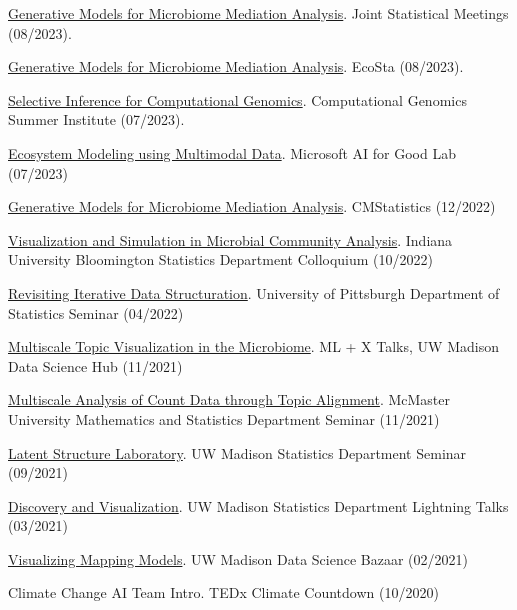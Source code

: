 \documentclass[letterpaper]{article}
\renewenvironment{itemize}{
  \begin{list}{}{
    \setlength{\leftmargin}{1.5em}
  }
}{
  \end{list}
}
\begin{document}
\begin{itemize}
  \item \href{https://drive.google.com/file/d/1lQBb665vsyILnknqMdGZMPkj-7Nhhgqw/view?usp=drive_link}{Generative Models for Microbiome Mediation Analysis}. Joint Statistical Meetings (08/2023).
  \item \href{https://go.wisc.edu/77q6rs}{Generative Models for Microbiome Mediation Analysis}. EcoSta (08/2023).
  \item \href{https://go.wisc.edu/7l1k95}{Selective Inference for Computational Genomics}. Computational Genomics Summer Institute (07/2023).
  \item \href{https://krisrs1128.github.io/talks/2023/20230705/20230705.html}{Ecosystem Modeling using Multimodal Data}. Microsoft AI for Good Lab (07/2023)
  \item \href{https://krisrs1128.github.io/talks/2022/20221217/20221217.html}{Generative Models for Microbiome Mediation Analysis}. CMStatistics (12/2022)
  \item \href{https://krisrs1128.github.io/talks/2022/20221021/20221021.html}{Visualization and Simulation in Microbial Community Analysis}. Indiana University Bloomington Statistics Department Colloquium (10/2022)
  \item \href{https://drive.google.com/file/d/1ju9f8e8aRb5OYLE28Ub0Pc6i2KCpcjgN/view?usp=sharing}{Revisiting Iterative Data Structuration}. University of Pittsburgh Department of Statistics Seminar (04/2022)
  \item \href{https://drive.google.com/file/d/14Lwhvd28sGEMSpw3AXZUsg8XXL25Gr4J/view?usp=sharing}{Multiscale Topic Visualization in the Microbiome}. ML + X Talks, UW Madison Data Science Hub (11/2021)
  \item \href{https://drive.google.com/file/d/1vcs_aLp6gZFixenGscrj6C5koEltxvGa/view?usp=sharing}{Multiscale Analysis of Count Data through Topic Alignment}. McMaster University Mathematics and Statistics Department Seminar (11/2021)
  \item \href{https://drive.google.com/file/d/1xwYyGc1bx7W-F5QyQlB3OJZT7MVTpdYd/view?usp=sharing}{Latent Structure Laboratory}. UW Madison Statistics Department Seminar (09/2021)
  \item \href{https://drive.google.com/drive/folders/16P8ZeKM1IEZFgCHgSxakUymamMZkNkTl}{Discovery and Visualization}. UW Madison Statistics Department Lightning Talks (03/2021)
  \item \href{https://krisrs1128.github.io/mapping-vis/}{Visualizing Mapping Models}. UW Madison Data Science Bazaar (02/2021)
  \item Climate Change AI Team Intro. TEDx Climate Countdown (10/2020)

\end{itemize}
\end{document}
